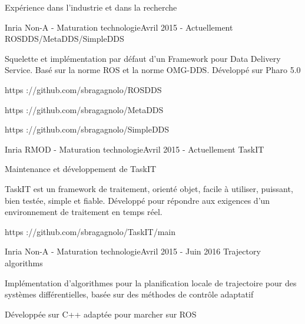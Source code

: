 \documentclass{resume} %
\begin{document}
\begin{rSection}{Exp\'{e}rience dans l'industrie et dans la recherche}
	\begin{rSubsection}{Inria Non-A - Maturation technologie}{Avril 2015 - Actuellement }{ROSDDS/MetaDDS/SimpleDDS}
		\item 		
		\item Squelette et impl\'{e}mentation par d\'{e}faut d'un Framework pour Data Delivery Service.  Bas\'{e} sur la norme ROS et la norme OMG-DDS. D\'{e}velopp\'{e} sur Pharo 5.0 
		\item https ://github.com/sbragagnolo/ROSDDS		
		\item https ://github.com/sbragagnolo/MetaDDS
		\item https ://github.com/sbragagnolo/SimpleDDS
	\end{rSubsection}
	\begin{rSubsection}{Inria RMOD - Maturation technologie}{Avril 2015 - Actuellement }{TaskIT}
		\item 	
		\item Maintenance et d\'{e}veloppement de TaskIT
		\item TaskIT est un framework de traitement, orient\'{e} objet, facile \`{a} utiliser, puissant, bien test\'{e}e, simple et fiable. D\'{e}velopp\'{e} pour r\'{e}pondre aux exigences d'un environnement de traitement en temps r\'{e}el.
		\item  https ://github.com/sbragagnolo/TaskIT/main
	\end{rSubsection}
	\begin{rSubsection}{Inria Non-A - Maturation technologie}{Avril 2015 - Juin 2016 }{Trajectory algorithms}
		\item 
		\item Impl\'{e}mentation d'algorithmes pour la planification locale de trajectoire pour des syst\`emes diff\'{e}rentielles, bas\'{e}e sur des m\'ethodes de contr\^ole adaptatif 
		\item D\'{e}velopp\'{e}e sur C++ adapt\'{e}e pour marcher sur ROS
	\end{rSubsection}




\end{rSection}
\end{document}
